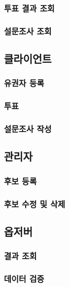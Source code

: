 \documentclass[11pt,a4paper,left=15mm,right=15mm,top=20mm,bottom=20mm]{article}
\begin{document}
        \subsubsection{투표 결과 조회}

        \subsubsection{설문조사 조회}

    \subsection{클라이언트}

        \subsubsection{유권자 등록}

        \subsubsection{투표}

        \subsubsection{설문조사 작성}

    \subsection{관리자}

        \subsubsection{후보 등록}

        \subsubsection{후보 수정 및 삭제}

    \subsection{옵저버}

        \subsubsection{결과 조회}

        \subsubsection{데이터 검증}
\end{document}
